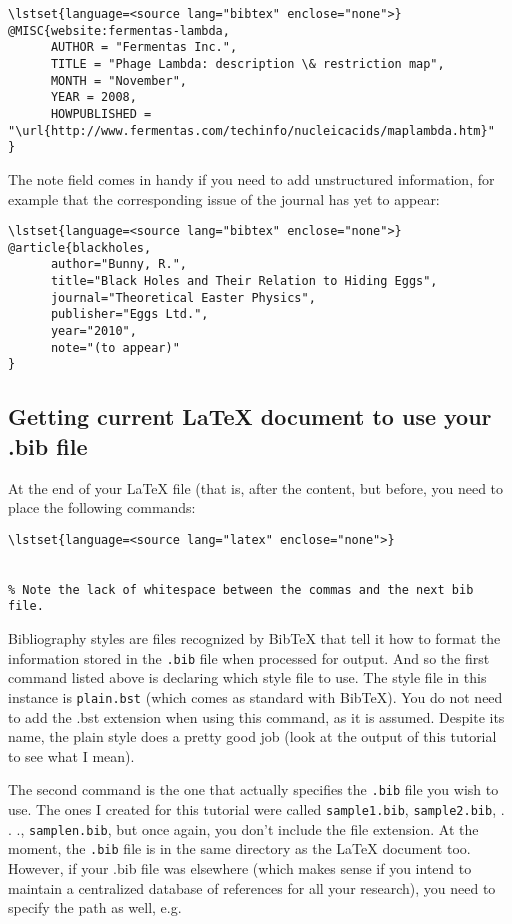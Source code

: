 \begin{lstlisting}
\lstset{language=<source lang="bibtex" enclose="none">}
@MISC{website:fermentas-lambda,
      AUTHOR = "Fermentas Inc.",
      TITLE = "Phage Lambda: description \& restriction map",
      MONTH = "November",
      YEAR = 2008,
      HOWPUBLISHED = "\url{http://www.fermentas.com/techinfo/nucleicacids/maplambda.htm}"
}
\end{lstlisting}
The note field comes in handy if you need to add unstructured information, for
example that the corresponding issue of the journal has yet to appear:

\begin{lstlisting}
\lstset{language=<source lang="bibtex" enclose="none">}
@article{blackholes,
      author="Bunny, R.",
      title="Black Holes and Their Relation to Hiding Eggs",
      journal="Theoretical Easter Physics",
      publisher="Eggs Ltd.",
      year="2010",
      note="(to appear)"
}
\end{lstlisting}

\subsection{Getting current LaTeX document to use your .bib file}
At the end of your LaTeX file (that is, after the content, but
before\verb||, you need to place the following commands:

\begin{lstlisting}
\lstset{language=<source lang="latex" enclose="none">}

 
% Note the lack of whitespace between the commas and the next bib file.
\end{lstlisting}
Bibliography styles are files recognized by BibTeX that tell it how to format
the information stored in the \verb|.bib| file when processed for output. And
so the first command listed above is declaring which style file to use. The
style file in this instance is \verb|plain.bst| (which comes as standard with
BibTeX). You do not need to add the .bst extension when using this command, as
it is assumed. Despite its name, the plain style does a pretty good job (look
at the output of this tutorial to see what I mean).

The second command is the one that actually specifies the \verb|.bib| file
you wish to use. The ones I created for this tutorial were called
\verb|sample1.bib|, \verb|sample2.bib|, . . ., \verb|samplen.bib|, but
once again, you don't include the file extension. At the moment, the
\verb|.bib| file is in the same directory as the LaTeX document too. However,
if your .bib file was elsewhere (which makes sense if you intend to maintain a
centralized database of references for all your research), you need to specify
the path as well, e.g\verb||.

